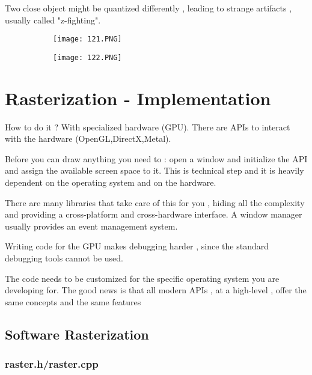 \documentclass{article}
\begin{document}
Two close object might be quantized differently , leading to strange artifacts , usually called "z-fighting".

\begin{figure}[ht!]
  \centering
  \begin{subfigure}[b]{0.3\linewidth}
    \texttt{[image: 121.PNG]}
  \end{subfigure}
\end{figure}

\begin{figure}[ht!]
  \centering
  \begin{subfigure}[b]{0.4\linewidth}
    \texttt{[image: 122.PNG]}
  \end{subfigure}
\end{figure}


\section{Rasterization - Implementation}

How to do it ? With specialized hardware (GPU).
There are APIs to interact with the hardware (OpenGL,DirectX,Metal).

Before you can draw anything you need to : open a window and initialize the API and assign the available screen space to it.
This is technical step and it is heavily dependent on the operating system and on the hardware.

There are many libraries that take care of this for you , hiding all the complexity and providing a cross-platform and cross-hardware interface. A window manager usually provides an event management system.

Writing code for the GPU makes debugging harder , since the standard debugging tools cannot be used.

The code needs to be customized for the specific operating system you are developing for.
The good news is that all modern APIs , at a high-level , offer the same concepts and the same features

\subsection{Software Rasterization}

\subsubsection{raster.h/raster.cpp}
\end{document}
